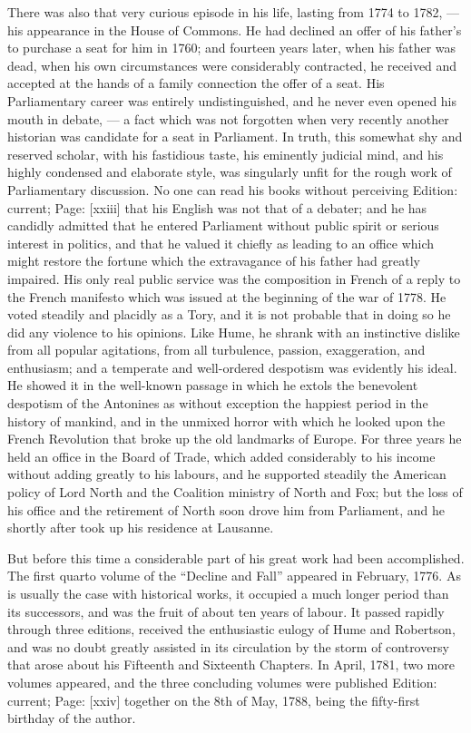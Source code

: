 There was also that very curious episode in his life, lasting from 1774 to 1782, \texthebrew{—} his appearance in the House of Commons. He had declined an offer of his father\texthebrew{}’s to purchase a seat for him in 1760; and fourteen years later, when his father was dead, when his own circumstances were considerably contracted, he received and accepted at the hands of a family connection the offer of a seat. His Parliamentary career was entirely undistinguished, and he never even opened his mouth in debate, \texthebrew{—} a fact which was not forgotten when very recently another historian was candidate for a seat in Parliament. In truth, this somewhat shy and reserved scholar, with his fastidious taste, his eminently judicial mind, and his highly condensed and elaborate style, was singularly unfit for the rough work of Parliamentary discussion. No one can read his books without perceiving Edition: current; Page: [xxiii] that his English was not that of a debater; and he has candidly admitted that he entered Parliament without public spirit or serious interest in politics, and that he valued it chiefly as leading to an office which might restore the fortune which the extravagance of his father had greatly impaired. His only real public service was the composition in French of a reply to the French manifesto which was issued at the beginning of the war of 1778. He voted steadily and placidly as a Tory, and it is not probable that in doing so he did any violence to his opinions. Like Hume, he shrank with an instinctive dislike from all popular agitations, from all turbulence, passion, exaggeration, and enthusiasm; and a temperate and well-ordered despotism was evidently his ideal. He showed it in the well-known passage in which he extols the benevolent despotism of the Antonines as without exception the happiest period in the history of mankind, and in the unmixed horror with which he looked upon the French Revolution that broke up the old landmarks of Europe. For three years he held an office in the Board of Trade, which added considerably to his income without adding greatly to his labours, and he supported steadily the American policy of Lord North and the Coalition ministry of North and Fox; but the loss of his office and the retirement of North soon drove him from Parliament, and he shortly after took up his residence at Lausanne.

But before this time a considerable part of his great work had been accomplished. The first quarto volume of the \texthebrew{“}Decline and Fall\texthebrew{}” appeared in February, 1776. As is usually the case with historical works, it occupied a much longer period than its successors, and was the fruit of about ten years of labour. It passed rapidly through three editions, received the enthusiastic eulogy of Hume and Robertson, and was no doubt greatly assisted in its circulation by the storm of controversy that arose about his Fifteenth and Sixteenth Chapters. In April, 1781, two more volumes appeared, and the three concluding volumes were published Edition: current; Page: [xxiv] together on the 8th of May, 1788, being the fifty-first birthday of the author.

